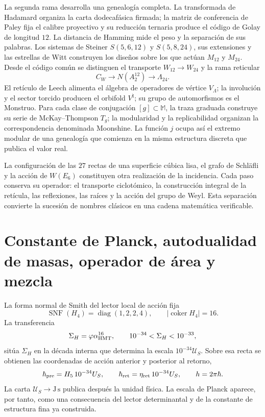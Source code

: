 La segunda rama desarrolla una genealogía completa. La transformada de
Hadamard organiza la carta dodecafásica firmada; la matriz de conferencia de
Paley fija el calibre proyectivo y su reducción ternaria produce el código
de Golay de longitud \(12\). La distancia de Hamming mide el peso y la
separación de sus palabras. Los sistemas de Steiner
\(S(5,6,12)\) y \(S(5,8,24)\), sus extensiones y las estrellas de Witt
construyen los diseños sobre los que actúan \(M_{12}\) y \(M_{24}\). Desde
el código común se distinguen el transporte \(W_{12}\to W_{24}\) y la rama
reticular
\[
 C_W\longrightarrow N(A_2^{12})\longrightarrow\Lambda_{24}.
\]
El retículo de Leech alimenta el álgebra de operadores de vértice
\(V_\Lambda\); la involución y el sector torcido producen el orbifold
\(V^\natural\); su grupo de automorfismos es el Monstruo. Para cada clase de
conjugación \([g]\subset\mathbb M\), la traza graduada construye su serie de
McKay--Thompson \(T_g\); la modularidad y la replicabilidad organizan la
correspondencia denominada Moonshine. La función \(j\) ocupa así el extremo
modular de una genealogía que comienza en la misma estructura discreta que
publica el valor real.

La configuración de las \(27\) rectas de una superficie cúbica lisa,
el grafo de Schläfli y la acción de \(W(E_6)\) constituyen otra realización
de la incidencia. Cada paso conserva su operador: el transporte ciclotómico,
la construcción integral de la retícula, las reflexiones, las raíces y la
acción del grupo de Weyl. Esta separación convierte la sucesión de nombres
clásicos en una cadena matemática verificable.

\section*{Constante de Planck, autodualidad de masas, operador de área y mezcla}

La forma normal de Smith del lector local de acción fija
\[
 \operatorname{SNF}(H_4)=\operatorname{diag}(1,2,2,4),
 \qquad |\operatorname{coker}H_4|=16.
\]
La transferencia
\[
 \Sigma_H=\varphi\alpha_{\rm HMT}^{16},
 \qquad 10^{-34}<\Sigma_H<10^{-33},
\]
sitúa \(\Sigma_H\) en la década interna que determina la escala
\(10^{-34}\mathcal U_S\). Sobre esa recta se obtienen las
coordenadas de acción anterior y posterior al retorno,
\[
 \hbar_{\rm pre}=H_5\,10^{-34}\mathcal U_S,
 \qquad
 \hbar_{\rm ret}=\eta_{\rm ret}\,10^{-34}\mathcal U_S,
 \qquad h=2\pi\hbar.
\]
La carta \(\mathcal U_S\to\mathrm{J\,s}\) publica después la unidad física.
La escala de Planck aparece, por tanto, como una consecuencia del lector
determinantal y de la constante de estructura fina ya construida.

